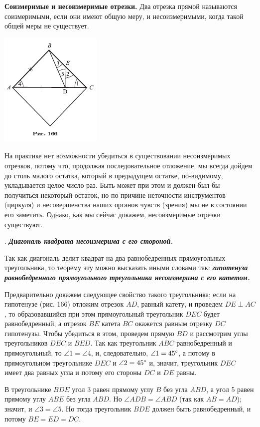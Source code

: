 \documentclass[oneside]{book}
\begin{document}
\textbf{Соизмеримые и несоизмеримые отрезки.}
Два отрезка прямой называются соизмеримыми, если они имеют общую меру, и несоизмеримыми, когда такой общей меры не существует.

\includegraphics{pics/ris-166}

На практике нет возможности убедиться в существовании несоизмеримых отрезков, потому что, продолжая последовательное отложение, мы всегда дойдем до столь малого остатка, который в предыдущем остатке, по-видимому, укладывается целое число раз.
Быть может при этом и должен был бы получиться некоторый остаток, но по причине неточности инструментов (циркуля) и несовершенства наших органов чувств (зрения) мы не в состоянии его заметить.
Однако, как мы сейчас докажем, несоизмеримые отрезки существуют.

.
\textbf{\emph{Диагональ квадрата несоизмерима с его стороной.}}

Так как диагональ делит квадрат на два равнобедренных прямоугольных треугольника, то теорему эту можно высказать иными словами так:
\textbf{\emph{гипотенуза равнобедренного прямоугольного треугольника несоизмерима с его катетом.}}

Предварительно докажем следующее свойство такого треугольника;
если на гипотенузе (рис. 166) отложим отрезок $AD$, равный катету, и проведем $DE\perp AC$, то образовавшийся при этом прямоугольный треугольник $DEC$ будет равнобедренный, а отрезок $BE$ катета $BC$ окажется равным отрезку $DC$ гипотенузы.
Чтобы убедиться в этом, проведем прямую $BD$ и рассмотрим углы треугольников $DEC$ и $BED$.
Так как треугольник $ABC$ равнобедренный и прямоугольный, то $\angle 1 = \angle 4$, и, следовательно, $\angle 1 = 45\degree$, а потому в прямоугольном треугольнике $DEC$ и $\angle 2 = 45\degree$ и, значит, треугольник $DEC$ имеет два равных угла и потому его стороны $DC$ и $DE$ равны.

В треугольнике $BDE$ угол 3 равен прямому углу $B$ без угла $ABD$, а угол 5 равен прямому углу $ABE$ без угла $ABD$.
Но $\angle ADB = \angle ABD$ (так как $AB=AD$);
значит, и $\angle 3 = \angle 5$.
Но тогда треугольник $BDE$ должен быть равнобедренный, и потому $BE=ED=DC$.
\end{document}
